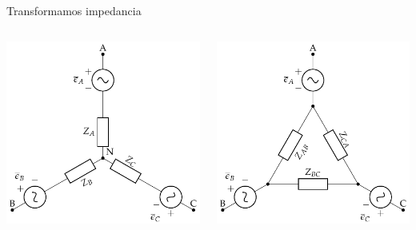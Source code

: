 \documentclass[aspectratio=169, usenames,svgnames,dvipsnames]{beamer}
\begin{document}
\begin{frame}[label={sec:orgd1ad22e}]{Transformamos impedancia}
\begin{columns}
\begin{column}{0.4\columnwidth}
\begin{center}
\includegraphics[width=\textwidth]{../figs/GeneradorRealEstrella.pdf}
\end{center}
\end{column}

\begin{column}{0.4\columnwidth}
\begin{center}
\includegraphics[width=\textwidth]{../figs/GeneradorRealEstrella_ZTriangulo.pdf}
\end{center}
\end{column}
\end{columns}
\end{frame}
\end{document}
